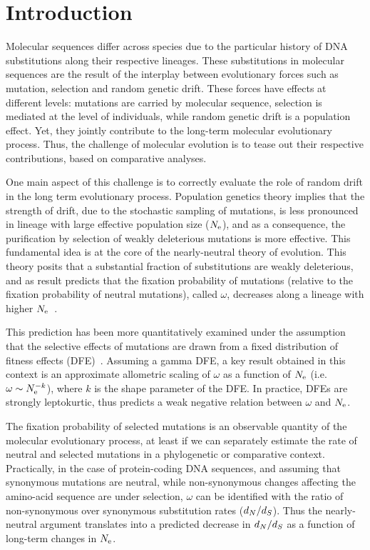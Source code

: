 \section{Introduction}
Molecular sequences differ across species due to the particular history of \acrshort{DNA} substitutions along their respective lineages.
These substitutions in molecular sequences are the result of the interplay between evolutionary forces such as mutation, selection and random genetic drift.
These forces have effects at different levels: mutations are carried by molecular sequence, selection is mediated at the level of individuals, while random genetic drift is a population effect.
Yet, they jointly contribute to the long-term molecular evolutionary process.
Thus, the challenge of molecular evolution is to tease out their respective contributions, based on comparative analyses.

One main aspect of this challenge is to correctly evaluate the role of random drift in the long term evolutionary process.
Population genetics theory implies that the strength of drift, due to the stochastic sampling of mutations, is less pronounced in lineage with large effective population size ($N_{\mathrm{e}}$), and as a consequence, the purification by selection of weakly deleterious mutations is more effective.
This fundamental idea is at the core of the nearly-neutral theory of evolution.
This theory posits that a substantial fraction of substitutions are weakly deleterious, and as result predicts that the fixation probability of mutations (relative to the fixation probability of neutral mutations), called $\omega$, decreases along a lineage with higher $N_{\mathrm{e}}$~\citep{Ohta1972, Ohta1992}.

This prediction has been more quantitatively examined under the assumption that the selective effects of mutations are drawn from a fixed distribution of fitness effects (\acrshort{DFE})~\citep{Kimura1979, Welch2008}.
Assuming a gamma \acrshort{DFE}, a key result obtained in this context is an approximate allometric scaling of $\omega$ as a function of $N_{\mathrm{e}}$ (i.e. $\omega \sim N_{\mathrm{e}}^{-k}$), where $k$ is the shape parameter of the \acrshort{DFE}.
In practice, DFEs are strongly leptokurtic, thus predicts a weak negative relation between $\omega$ and $N_{\mathrm{e}}$.

The fixation probability of selected mutations is an observable quantity of the molecular evolutionary process, at least if we can separately estimate the rate of neutral and selected mutations in a phylogenetic or comparative context.
Practically, in the case of protein-coding \acrshort{DNA} sequences, and assuming that synonymous mutations are neutral, while non-synonymous changes affecting the amino-acid sequence are under selection, $\omega$ can be identified with the ratio of non-synonymous over synonymous substitution rates ($d_N / d_S$).
Thus the nearly-neutral argument translates into a predicted decrease in $d_N / d_S$ as a function of long-term changes in $N_{\mathrm{e}}$.

